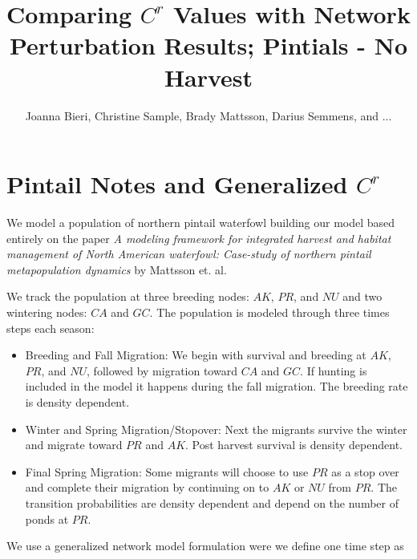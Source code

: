 \documentclass[10pt]{article}
\title{Comparing $C^r$ Values with Network Perturbation Results; Pintials - No Harvest}
\date{}
\author{Joanna Bieri, Christine Sample, Brady Mattsson, Darius Semmens, and ...}
\begin{document}


\newcommand{\multilineR}[1]{\begin{tabular}[b]{@{}r@{}}#1\end{tabular}}
\newcommand{\multilineL}[1]{\begin{tabular}[b]{@{}l@{}}#1\end{tabular}}
\newcommand{\multilineC}[1]{\begin{tabular}[b]{@{}c@{}}#1\end{tabular}}

\thispagestyle{empty}

\maketitle

\tableofcontents


\section{Pintail Notes and Generalized \texorpdfstring{$C^r$}{CR} }
We model a population of northern pintail waterfowl building our model based entirely on the paper {\it{A modeling framework for integrated harvest and habitat management of North American waterfowl: Case-study of northern pintail metapopulation dynamics}} by Mattsson et. al.

We track the population at three breeding nodes: $AK$, $PR$, and $NU$ and two wintering nodes: $CA$ and $GC$. The population is modeled through three times steps each season:
\begin{itemize}
\item Breeding and Fall Migration: We begin with survival and breeding at $AK$, $PR$, and $NU$, followed by migration toward $CA$ and $GC$. If hunting is included in the model it happens during the fall migration. The breeding rate is density dependent.
\item Winter and Spring Migration/Stopover: Next the migrants survive the winter and migrate toward $PR$ and $AK$. Post harvest survival is density dependent.
\item Final Spring Migration: Some migrants will choose to use $PR$ as a stop over and complete their migration by continuing on to $AK$ or $NU$ from $PR$. The transition probabilities are density dependent and depend on the number of ponds at $PR$.
\end{itemize}

We use a generalized network model formulation were we define one time step as
\end{document}
